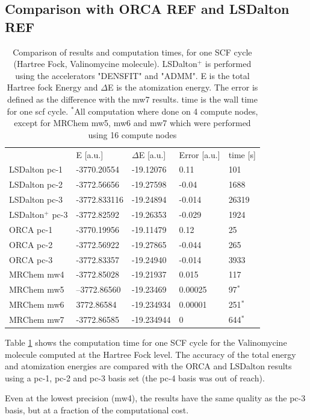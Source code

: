 \documentclass{article}
\begin{document}
\subsection{Comparison with ORCA REF and LSDalton REF}
\begin{table}[t]
    \centering
    \begin{tabular}{lllll}
     & E [a.u.] &$\Delta$E [a.u.]& Error [a.u.] & time [s]\\
    LSDalton pc-1 &-3770.20554&-19.12076&0.11&101\\
    LSDalton pc-2 &-3772.56656&-19.27598&-0.04&1688\\
    LSDalton pc-3 &-3772.833116&-19.24894&-0.014&26319\\
    LSDalton$^+$ pc-3 &-3772.82592&-19.26353&-0.029&1924\\
    ORCA pc-1 &-3770.19956&-19.11479&0.12&25\\
    ORCA pc-2 &-3772.56922&-19.27865&-0.044&265\\
    ORCA pc-3 &-3772.83357&-19.24940&-0.014&3933\\
    MRChem mw4&-3772.85028&-19.21937&0.015&117\\
    MRChem mw5&--3772.86560&-19.23469&0.00025& 97$^*$\\
    MRChem mw6&3772.86584&-19.234934&0.00001&251$^*$\\
    MRChem mw7&-3772.86585&-19.234944&0&644$^*$\\
       \end{tabular}    
    \caption{Comparison of results and computation times, for one SCF cycle (Hartree Fock, Valinomycine molecule). LSDalton$^+$ is performed using the accelerators "DENSFIT" and "ADMM". E is the total Hartree fock Energy and $\Delta$E is the atomization energy. The error is defined as the difference with the mw7 results. time is the wall time for one scf cycle. $^*$All computation where done on 4 compute nodes, except for MRChem mw5, mw6 and mw7 which were performed using 16 compute nodes}
        \label{tab:MRC_ORCA_LSD}
\end{table}

Table \ref{tab:MRC_ORCA_LSD} shows the computation time for one SCF cycle for the Valinomycine molecule computed at the Hartree Fock level. The accuracy of the total energy and atomization energies are compared with the ORCA and LSDalton
results using a pc-1, pc-2 and pc-3 basis set (the pc-4 basis was out of reach). 

Even at the lowest precision (mw4), the results have the same quality as the pc-3 basis, but at a fraction of the computational cost. 
\end{document}
